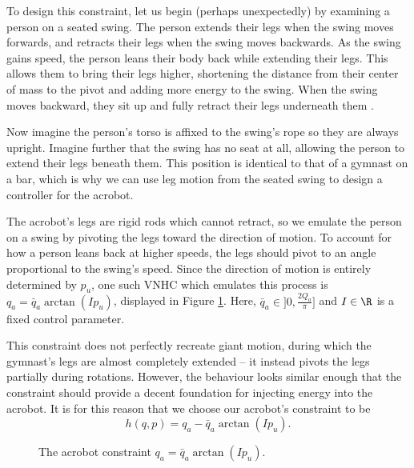To design this constraint, let us begin (perhaps unexpectedly) by examining a person on
a seated swing.
The person extends their legs when the swing moves forwards, and retracts their
legs when the swing moves backwards.
As the swing gains speed, the person leans their body back while
extending their legs.
This allows them to bring their legs higher, shortening the distance
from their center of mass to the pivot and adding more energy to the swing.
When the swing moves backward, they sit up and fully retract their legs
underneath them \cite{how_to_pump_a_swing}.

Now imagine the person's torso is affixed to the swing's rope so they are
always upright. 
Imagine further that the swing has no seat at all, allowing the person to extend
their legs beneath them. 
This position is identical to that of a gymnast on a bar, which is why we can
use leg motion from the seated swing to design a controller for the acrobot.

The acrobot's legs are rigid rods which cannot retract, so we emulate the person
on a swing by pivoting the legs toward the direction of motion. 
To account for how a person leans back at higher speeds, the legs should pivot to an
angle proportional to the swing's speed.
Since the direction of motion is entirely determined by \(p_u\), 
one such VNHC which emulates this process is \(q_a = \bar{q}_a\arctan( I p_u)\),
displayed in Figure \ref{fig:qa-arctan}.
Here, \(\bar{q}_a \in ]0,\frac{2 Q_a}{\pi}]\) and \(I \in \R\) is a fixed
control parameter.

This constraint does not perfectly recreate giant motion, during which
the gymnast's legs are almost completely extended \cite{usagym_giant}
-- it instead pivots the legs partially during rotations.
However, the behaviour looks similar enough that the constraint should provide a
decent foundation for injecting energy into the acrobot.
It is for this reason that we choose our acrobot's constraint to be
\begin{equation}\label{eqn:acrobot-constraint}
    h(q,p) = q_a - \bar{q}_a \arctan(I p_u)
    .
\end{equation}

\begin{figure}
    \centering
    
    \caption{The acrobot constraint \(q_a = \bar{q}_a \arctan(I p_u)\).}
    \label{fig:qa-arctan}
\end{figure}

